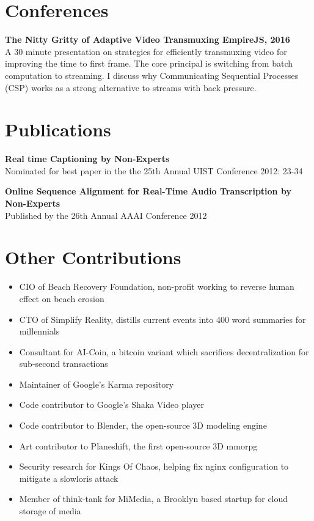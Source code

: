 \documentclass[oneside, final]{scrartcl}
\begin{document}
\begin{center}
\begin{comment}
 \end{comment}


\section{Conferences}
\begin{flushleft}
\textbf{The Nitty Gritty of Adaptive Video Transmuxing \hfill EmpireJS, 2016\\}
A 30 minute presentation on strategies for efficiently transmuxing video for improving the
time to first frame. The core principal is switching from batch computation to streaming.
I discuss why Communicating Sequential Processes (CSP) works as a strong alternative to streams with back pressure.
\end{flushleft}

\section{Publications}
\begin{flushleft}
\textbf{Real time Captioning by Non-Experts\\}
Nominated for best paper in the the 25th Annual UIST Conference 2012: 23-34\\

\vspace{10pt}

\textbf{Online Sequence Alignment for Real-Time Audio Transcription by Non-Experts \\}
Published by the 26th Annual AAAI Conference 2012\\
\end{flushleft}


\section{Other Contributions}
\begin{itemize}
    \item CIO of Beach Recovery Foundation, non-profit working to reverse human effect on beach erosion
    \item CTO of Simplify Reality, distills current events into 400 word summaries for millennials
    \item Consultant for AI-Coin, a bitcoin variant which sacrifices decentralization for sub-second transactions
    \item Maintainer of Google's Karma repository
    \item Code contributor to Google's Shaka Video player
    \item Code contributor to Blender, the open-source 3D modeling engine
    \item Art contributor to Planeshift, the first open-source 3D mmorpg
    \item Security research for Kings Of Chaos, helping fix nginx configuration to mitigate a slowloris attack
    \item Member of think-tank for MiMedia, a Brooklyn based startup for cloud storage of media
\end{itemize}



\end{center}
\end{document}
